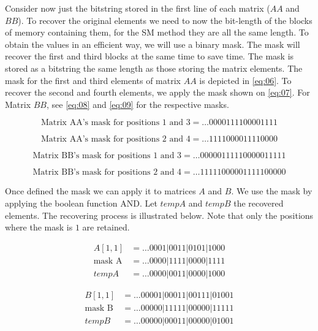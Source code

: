 \documentclass[12pt]{article}
\begin{document}
Consider now just the bitstring stored in the first line of each matrix ($AA$
and $BB$). To recover the original elements we need to now the bit-length of
the blocks of memory containing them, for the SM method they are all the same
length. To obtain the values in an efficient way, we will use a binary mask.
The mask will recover the first and third blocks at the same time to save time.
The mask is stored as a bitstring the same length as those storing the matrix
elements. The mask for the first and third elements of matrix $AA$ is depicted
in \ref{eq:06}. To recover the second and fourth elements, we apply the mask
shown on \ref{eq:07}. For Matrix $BB$, see \ref{eq:08} and \ref{eq:09} for the
respective masks.

\begin{equation}\label{eq:06}
\text{Matrix AA's mask for positions 1 and 3} = \ldots0000111100001111
\end{equation}

\begin{equation}\label{eq:07}
\text{Matrix AA's mask for positions 2 and 4} = \ldots1111000011110000
\end{equation}

\begin{equation}\label{eq:08}
\text{Matrix BB's mask for positions 1 and 3} = \ldots00000111110000011111
\end{equation}

\begin{equation}\label{eq:09}
\text{Matrix BB's mask for positions 2 and 4} = \ldots11111000001111100000
\end{equation}

Once defined the mask we can apply it to matrices $A$ and $B$. We use the mask
by applying the boolean function AND. Let $tempA$ and $tempB$ the recovered
elements. The recovering process is illustrated below. Note that only the
positions where the mask is $1$ are retained.

  \begin{align*}
   A[1,1]		&=	\ldots0001|0011|0101|1000\\
   \text{mask A}	&=	\ldots0000|1111|0000|1111\\
   tempA 		&=	\ldots0000|0011|0000|1000
  \end{align*}

  \begin{align*}
   B[1,1]		&= \ldots00001|00011|00111|01001 \\
   \text{mask B}	&= \ldots00000|11111|00000|11111 \\
   tempB 		&= \ldots00000|00011|00000|01001
  \end{align*}
\end{document}

